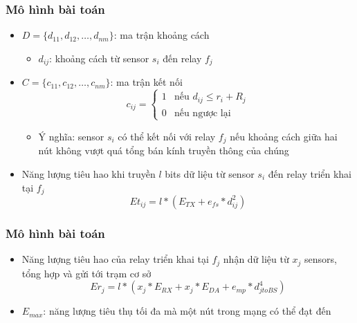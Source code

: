 \begin{frame}
    \frametitle{Mô hình bài toán}
    \begin{itemize}
        \item $D = \{d_{11}, d_{12},…, d_{nm}\}$: ma trận khoảng cách 
    \begin{itemize}
        \item[] $d_{ij}$: khoảng cách từ sensor $s_i$ đến relay $f_j$
    \end{itemize}
    \item $C = \{c_{11}, c_{12},…, c_{nm}\}$: ma trận kết nối
    \begin{equation} 
        c_{ij} = \begin{cases}
            1 & \textrm{nếu $d_{ij} \leq r_i + R_j$}\\
            0 & \textrm{nếu ngược lại}
        \end{cases}
        \label{eqn:simple_one} 
    \end{equation}     
    \begin{itemize}
        \item[] Ý nghĩa: sensor $s_i$ có thể kết nối với relay $f_j$ nếu khoảng cách giữa hai nút không vượt quá tổng bán kính truyền thông của chúng
    \end{itemize}
    \item Năng lượng tiêu hao khi truyền $l$ bits dữ liệu từ sensor $s_i$ đến relay triển khai tại $f_j$
    \begin{equation}
        Et_{ij} = l * (E_{TX} + e_{fs} * d_{ij}^2)
        \label{sensor_consumption}
    \end{equation}
    \end{itemize}
\end{frame}

\begin{frame}
    \frametitle{Mô hình bài toán}
    \begin{itemize}
        \item Năng lượng tiêu hao của relay triển khai tại $f_j$ nhận dữ liệu từ $x_j$ sensors, tổng hợp và gửi tới trạm cơ sở
    \begin{equation}
        Er_j = l * (x_j * E_{RX} + x_j * E_{DA} + e_{mp} * d_{jtoBS}^4)
        \label{relay_consumption}
    \end{equation}
    \item $E_{max}$: năng lượng tiêu thụ tối đa mà một nút trong mạng có thể đạt đến
    \end{itemize}
\end{frame}

